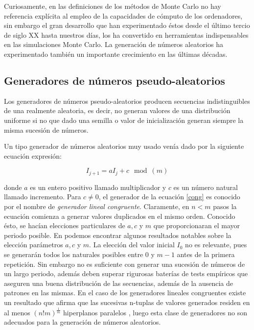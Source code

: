 \documentclass[../proyecto.tex]{memoir}
\begin{document}
Curiosamente, en las definiciones de los métodos de Monte Carlo no hay referencia explícita al empleo de la capacidades de cómputo de los ordenadores, sin embargo el gran desarrollo que han experimentado éstos desde el último tercio de siglo XX hasta nuestros días, los ha convertido en herramientas indispensables en las simulaciones Monte Carlo. La generación de números aleatorios ha experimentado también un importante crecimiento en las últimas décadas.

\subsection{Generadores de números pseudo-aleatorios}

Los generadores de números pseudo-aleatorios producen secuencias indistinguibles de una realmente aleatoria, es decir, no generan valores de una distribución uniforme si no que dado una semilla o valor de inicialización generan siempre la misma sucesión de números.

Un tipo generador de números aleatorios muy usado venía dado por la siguiente ecuación expresión:

\begin{equation} \label{cong}
I_{j+1} = aI_{j} +c \mod (m)
\end{equation}

donde $a$ es un entero positivo llamado multiplicador y $c$ es un número natural llamado incremento. Para $c \neq 0$, el generador de la ecuación \ref{cong} es conocido por el nombre de \textit{generador lineal congruente}. Claramente, en $n<m$ pasos la ecuación comienza a generar valores duplicados en el mismo orden. Conocido ésto, se hacían elecciones particulares de $a,c$ y $m$ que proporcionaran el mayor periodo posible. En \cite{knuth} podemos encontrar algunos resultados notables sobre la elección parámetros $a,c$ y $m$. La elección del valor inicial $I_{0}$ no es relevante, pues se generarán todos los naturales posibles entre $0$ y $m-1$ antes de la primera repetición. Sin embargo no es suficiente con generar una sucesión de números de un largo periodo, además deben superar rigurosas baterías de tests empíricos que aseguren una buena distribución de las secuencias, además de la ausencia de patrones en las mismas. En el caso de los generadores lineales congruentes existe un resultado que afirma que las sucesivas n-tuplas de valores generados residen en al menos $(n!m)^\frac{1}{m}$ hiperplanos paralelos \cite{marsagliaRandom}, luego esta clase de generadores no son adecuados para la generación de números aleatorios.
\end{document}
